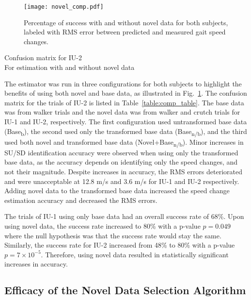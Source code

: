 \begin{figure}
	\centering
	\texttt{[image: novel\_comp.pdf]}
	\caption{Percentage of success with and without novel data for both subjects, labeled with RMS error between predicted and measured gait speed changes.}\label{fig:novel_comp}
\end{figure}

\begin{table}
	\centering
	\caption{Confusion matrix for IU-2 \\ For estimation with and without novel data }\label{table:comp_table}
	
\end{table}

The  estimator was run in three configurations for both subjects to highlight the benefits of using both novel and base data, as illustrated in Fig.~\ref{fig:novel_comp}. The confusion matrix for the trials of IU-2 is listed in Table~\ref{table:comp_table}. The base data was from walker trials and the novel data was from walker and crutch trials for IU-1 and IU-2, respectively. The first configuration used untransformed base data (Base\textsubscript{b}), the second used only the transformed base data (Base\textsubscript{n/b}), and the third used both novel and transformed base data (Novel+Base\textsubscript{n/b}). Minor increases in SU/SD identification accuracy were observed when using only the transformed base data, as the accuracy depends on identifying only the speed changes, and not their magnitude. Despite increases in accuracy, the RMS errors deteriorated and were unacceptable at 12.8 m/s and 3.6 m/s for IU-1 and IU-2 respectively. Adding novel data to the transformed base data increased the speed change estimation accuracy and decreased the RMS errors. 

The trials of IU-1 using only base data had an overall success rate of 68\%. Upon using novel data, the success rate increased to 80\% with a p-value $ p = 0.049$ where the null hypothesis was that the success rate would stay the same. Similarly, the success rate for IU-2 increased from 48\% to 80\% with a p-value $ p = 7\times10^{-5} $. Therefore, using novel data resulted in statistically significant increases in accuracy.

\subsection{Efficacy of the Novel Data Selection Algorithm}

